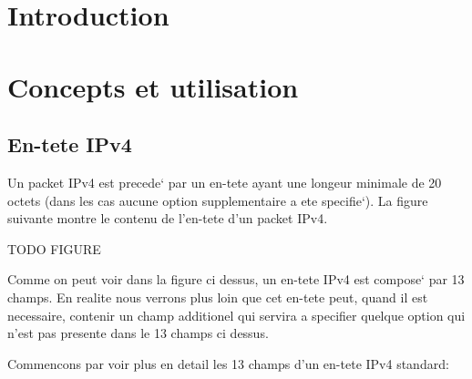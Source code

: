 \documentclass[twoside,openright,a4paper,11pt,french]{article}
\begin{document}
\pagestyle{plain}




\parskip=0pt
\tableofcontents


\section{Introduction}
\label{sec:intro}


\section{Concepts et utilisation}

\subsection{En-tete IPv4}
Un packet IPv4 est precede` par un en-tete ayant une longeur minimale de 20 octets 
(dans les cas aucune option supplementaire a ete specifie`).
La figure suivante montre le contenu de l'en-tete d'un packet IPv4.


TODO FIGURE


Comme on peut voir dans la figure ci dessus, un en-tete IPv4 est compose` par
13 champs. En realite nous verrons plus loin que cet en-tete peut, quand il est
necessaire, contenir un champ additionel qui servira a specifier quelque
option qui n'est pas presente dans le 13 champs ci dessus.


Commencons par voir plus en detail les 13 champs d'un en-tete IPv4 standard:
\end{document}
